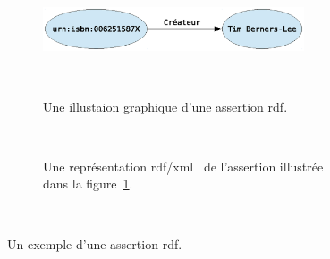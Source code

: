 \begin{figure}[h]
    \centering
    \begin{subfigure}[b]{1\textwidth}
    \centering
    \includegraphics[width=0.85\textwidth]{figs/A/rdf-statement-example-graph.eps}
    \caption{Une illustaion graphique d'une assertion
      \acrshort{rdf}.}~\label{fig:rdf-statement-example-graph}
    \end{subfigure}

    \begin{subfigure}[b]{1\textwidth}
      \centering
      
      \caption{Une représentation
        \acrshort{rdf/xml}~\cite{beckett2004rdf} de l'assertion
        illustrée dans la
        figure~\ref{fig:rdf-statement-example-graph}.}~\label{fig:rdf-statement-example-xml}
    \end{subfigure}

    \caption{Un exemple d'une assertion
      \acrshort{rdf}.}~\label{fig:rdf-statement-example}
\end{figure}
